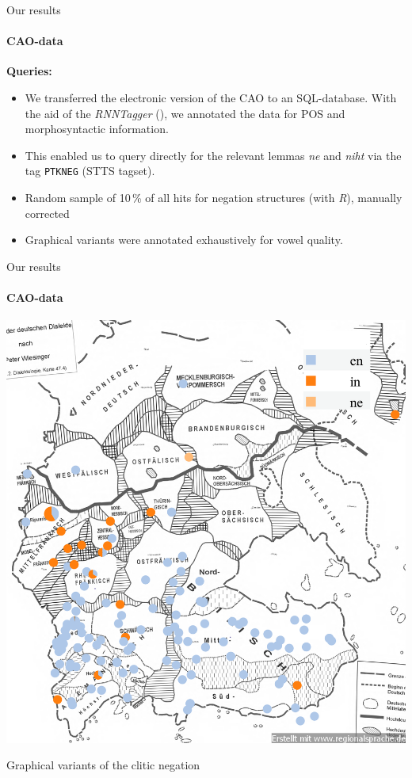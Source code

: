 \documentclass[xcolor=table, compress, %
handout
]{beamer}
\begin{document}
\begin{frame}{Our results}
\framesubtitle{CAO-data}

\textbf{Queries:}

\begin{itemize}
\item We transferred the electronic version of the CAO to an SQL-database. With the aid of the \textit{RNNTagger} (\citealt{schmid2020}), we annotated the data for POS and morphosyntactic information.
\item This enabled us to query directly for the relevant lemmas \textit{ne} and \textit{niht} via the tag \texttt{PTKNEG} (STTS tagset).
\item Random sample of 10\,\% of all hits for negation structures (with \textit{R}), manually corrected
\item Graphical variants were annotated exhaustively for vowel quality. 
\end{itemize}

\end{frame}


\begin{frame}{Our results}
\framesubtitle{CAO-data}

\begin{table}
\begin{center}
\includegraphics[scale=1]{Graphievarianten.png}
\end{center}
\caption{Graphical variants of the clitic negation}
\end{table}


\end{frame}
\end{document}
